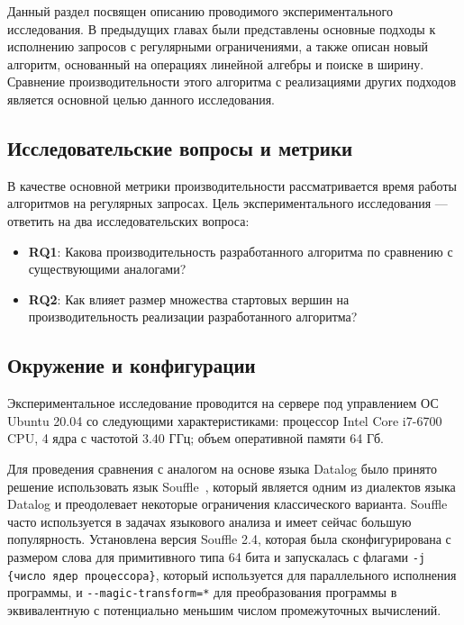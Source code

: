 
Данный раздел посвящен описанию проводимого экспериментального исследования. В предыдущих главах были представлены основные подходы к исполнению запросов с регулярными ограничениями, а также описан новый алгоритм, основанный на операциях линейной алгебры и поиске в ширину. Сравнение производительности этого алгоритма с реализациями других подходов является основной целью данного исследования.

\subsection{Исследовательские вопросы и метрики}

В качестве основной метрики производительности рассматривается время работы алгоритмов на регулярных запросах.
Цель экспериментального исследования --- ответить на два исследовательских вопроса:

\begin{itemize}
    \item \textbf{RQ1}: Какова производительность разработанного алгоритма по сравнению с существующими аналогами?
    \item \textbf{RQ2}: Как влияет размер множества стартовых вершин на производительность реализации разработанного алгоритма?
\end{itemize}

\subsection{Окружение и конфигурации}

Экспериментальное исследование проводится на сервере под управлением ОС Ubuntu 20.04 со следующими характеристиками: процессор Intel Core i7-6700 CPU, 4 ядра с частотой 3.40 ГГц; объем оперативной памяти 64 Гб.

Для проведения сравнения с аналогом на основе языка Datalog было принято решение использовать язык Souffle~\cite{souffle}, который является одним из диалектов языка Datalog и преодолевает некоторые ограничения классического варианта. Souffle часто используется в задачах языкового анализа и имеет сейчас большую популярность. Установлена версия Souffle 2.4, которая была сконфигурирована с размером слова для примитивного типа 64 бита и запускалась с флагами \verb|-j {число ядер процессора}|, который используется для параллельного исполнения программы, и \verb|--magic-transform=*| для преобразования программы в эквивалентную с потенциально меньшим числом промежуточных вычислений.

